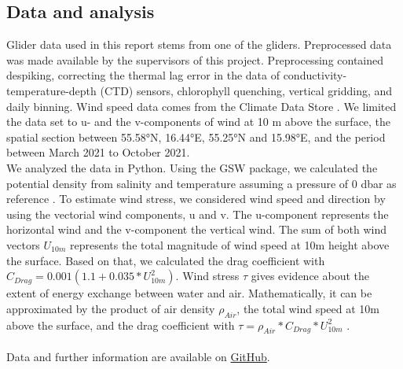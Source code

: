 \documentclass[../Main.tex]{subfiles}
\begin{document}
\subsection{Data and analysis}
Glider data used in this report stems from one of the gliders. 
Preprocessed data was made available by the supervisors of this project. 
Preprocessing contained despiking, correcting the thermal lag error in the data of conductivity-temperature-depth (CTD) sensors, chlorophyll quenching, vertical gridding, and daily binning. 
Wind speed data comes from the Climate Data Store \cite{Era5}. 
We limited the data set to u- and the v-components of wind at 10 m above the surface, the spatial section between 55.58°N, 16.44°E, 55.25°N and 15.98°E, and the period between March 2021 to October 2021.
\\
We analyzed the data in Python. Using the GSW package, we calculated the potential density from salinity and temperature assuming a pressure of 0 dbar as reference \cite{GSW2017}. 
To estimate wind stress, we considered wind speed and direction by using the vectorial wind components, u and v.
The u-component represents the horizontal wind and the v-component the vertical wind. 
The sum of both wind vectors $U_{10m}$ represents the total magnitude of wind speed at \si{10}{m} height above the surface. Based on that, we calculated the drag coefficient with $C_{Drag} = 0.001(1.1+0.035*U_{10m}^2)$. 
Wind stress $\tau$ gives evidence about the extent of energy exchange between water and air.
Mathematically, it can be approximated by the product of air density $\rho_{Air}$, the total wind speed at \si{10}{m} above the surface, and the drag coefficient with $\tau = \rho_{Air}*C_{Drag}*U_{10m}^2$ \cite{Mehrfar2018}.
\\
\\
Data and further information are available on \href{https://github.com/joaldi2208/BloomDynamics}{GitHub}.
\end{document}
